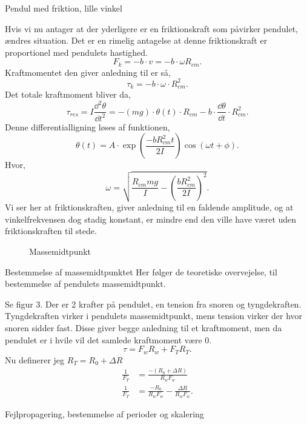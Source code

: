 \begin{subexercise}{Pendul med friktion, lille vinkel}

\end{subexercise}
\begin{solution}
Hvis vi nu antager at der yderligere er en friktionskraft som påvirker pendulet, ændres situation. Det er en rimelig antagelse at denne friktionskraft er proportionel med pendulets hastighed.
\[
F_k = -b\cdot v = -b\cdot \omega R_{cm} 
.\] 
Kraftmomentet den giver anledning til er så,
\[
\tau_k = -b \cdot \omega \cdot R_{cm}^2
.\]
Det totale kraftmoment bliver da,
\[
	\tau_{res} = I \frac{\dd^2 \theta}{\dd t^2} = -(mg)\cdot \theta (t) \cdot R_{cm} - b\cdot \frac{\dd \theta}{\dd t} \cdot R_{cm}^2
.\]
Denne differentialligning løses af funktionen,
\[
	\theta (t) = A\cdot \exp\left( \frac{-bR_{cm}^2t}{2I}\right)\cos(\omega t+ \phi)
.\] 
Hvor,
\[
\omega = \sqrt{\frac{R_{cm}mg}{I}- \left( \frac{bR_{cm}^2}{2I} \right) ^2} 
.\]
Vi ser her at friktionskraften, giver anledning til en faldende amplitude, og at vinkelfrekvensen dog stadig konstant, er mindre end den ville have været uden friktionskraften til stede.
\end{solution}
\begin{figure}[ht]
    \centering
    \caption{Massemidtpunkt}
    \label{fig:massemidtpunkt}
\end{figure}
\newpage
\begin{subexercise}{Bestemmelse af massemidtpunktet}
Her følger de teoretiske overvejelse, til bestemmelse af pendulets massemidtpunkt.
\end{subexercise}\newline
Se figur 3. Der er 2 krafter på pendulet, en tension fra snoren og tyngdekraften. Tyngdekraften virker i pendulets massemidtpunkt, mens tension virker der hvor snoren sidder fast. Disse giver begge anledning til et kraftmoment, men da pendulet er i hvile vil det samlede kraftmoment være 0.
\[
\tau = F_wR_w + F_TR_T
.\] 
Nu definerer jeg $R_T = R_0 + \Delta R$
\begin{align*}
	\frac{1}{F_T}&= \frac{-\left( R_0+\Delta R \right) }{R_wF_w} \\
	\frac{1}{F_T}&= \frac{-R_0}{R_wF_w}-\frac{\Delta R}{R_wF_w}
.\end{align*}
\begin{subexercise}{Fejlpropagering, bestemmelse af perioder og skalering}

\end{subexercise}
